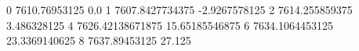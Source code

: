 0 7610.76953125 0.0
1 7607.8427734375 -2.9267578125
2 7614.255859375 3.486328125
4 7626.42138671875 15.65185546875
6 7634.1064453125 23.3369140625
8 7637.89453125 27.125
